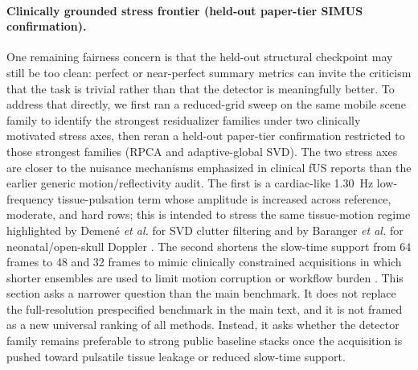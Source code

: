 \paragraph{Clinically grounded stress frontier (held-out paper-tier SIMUS confirmation).}
One remaining fairness concern is that the held-out structural checkpoint may still be too clean: perfect or near-perfect summary metrics can invite the criticism that the task is trivial rather than that the detector is meaningfully better. To address that directly, we first ran a reduced-grid sweep on the same mobile scene family to identify the strongest residualizer families under two clinically motivated stress axes, then reran a held-out paper-tier confirmation restricted to those strongest families (RPCA and adaptive-global SVD). The two stress axes are closer to the nuisance mechanisms emphasized in clinical fUS reports than the earlier generic motion/reflectivity audit. The first is a cardiac-like 1.30~Hz low-frequency tissue-pulsation term whose amplitude is increased across reference, moderate, and hard rows; this is intended to stress the same tissue-motion regime highlighted by Demen\'e \emph{et al.} for SVD clutter filtering and by Baranger \emph{et al.} for neonatal/open-skull Doppler \cite{DemeneClutterSVD2015,BarangerAdaptiveSVD2018}. The second shortens the slow-time support from 64 frames to 48 and 32 frames to mimic clinically constrained acquisitions in which shorter ensembles are used to limit motion corruption or workflow burden \cite{Imbault2017,Soloukey2020FUSAwake,MobileFUS2025}. This section asks a narrower question than the main benchmark. It does not replace the full-resolution prespecified benchmark in the main text, and it is not framed as a new universal ranking of all methods. Instead, it asks whether the detector family remains preferable to strong public baseline stacks once the acquisition is pushed toward pulsatile tissue leakage or reduced slow-time support.




